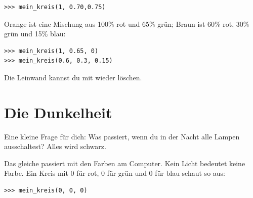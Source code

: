\begin{Verbatim}[frame=single]
>>> mein_kreis(1, 0.70,0.75)
\end{Verbatim}

\noindent
Orange ist eine Mischung aus 100\% rot und 65\% grün; Braun ist 60\% rot, 30\% grün und 15\% blau:

\begin{Verbatim}[frame=single]
>>> mein_kreis(1, 0.65, 0)
>>> mein_kreis(0.6, 0.3, 0.15)
\end{Verbatim}

\noindent
Die Leinwand kannst du mit  wieder löschen.

\section{Die Dunkelheit}

Eine kleine Frage für dich: Was passiert, wenn du in der Nacht alle Lampen ausschaltest? Alles wird schwarz.
\par
Das gleiche passiert mit den Farben am Computer. Kein Licht bedeutet keine Farbe. Ein Kreis mit 0 für rot, 0 für grün und 0 für blau schaut so aus:

\begin{Verbatim}[frame=single]
>>> mein_kreis(0, 0, 0)
\end{Verbatim}

